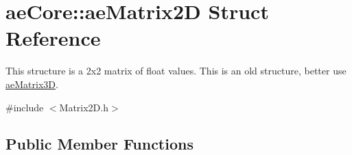 \hypertarget{structae_core_1_1ae_matrix2_d}{}\section{ae\+Core\+:\+:ae\+Matrix2D Struct Reference}
\label{structae_core_1_1ae_matrix2_d}


This structure is a 2x2 matrix of float values. This is an old structure, better use \hyperlink{structae_core_1_1ae_matrix3_d}{ae\+Matrix3D}.  




{\ttfamily \#include $<$Matrix2\+D.\+h$>$}

\subsection*{Public Member Functions}
